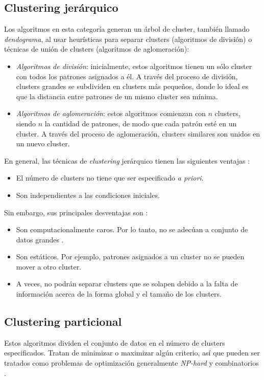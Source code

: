 \subsection{Clustering jerárquico}
Los algoritmos en esta categoría generan
un árbol de cluster, también llamado \emph{dendograma}, al usar heurísticas para
separar clusters (algoritmos de división) o técnicas de unión de clusters
(algoritmos de aglomeración):
    \begin{itemize}
        \item \emph{Algoritmos de división}: inicialmente, estos algoritmos
tienen un sólo cluster con todos los patrones asignados a él. A través del
proceso de división, clusters grandes se subdividen en clusters más pequeños,
donde lo ideal es que la distancia entre patrones de un mismo cluster sea
mínima.
        \item \emph{Algoritmos de aglomeración}: estos algoritmos comienzan con
$n$ clusters, siendo $n$ la cantidad de patrones, de modo que cada patrón esté
en un cluster. A través del proceso de aglomeración, clusters similares son
unidos en un nuevo cluster.
    \end{itemize}

En general, las técnicas de \emph{clustering} jerárquico tienen las siguientes
ventajas \cite{PSO_0}:
    \begin{itemize}
        \item El número de clusters no tiene que ser especificado \emph{a priori}.
        \item Son independientes a las condiciones iniciales.
    \end{itemize}
Sin embargo, sus principales desventajas son \cite{PSO_0}:
    \begin{itemize}
        \item Son computacionalmente caros. Por lo tanto, no se adecúan a conjunto
de datos grandes \cite{DC_2}.
        \item Son estáticos. Por ejemplo, patrones asignados a un cluster no se
pueden mover a otro cluster.
        \item A veces, no podrán separar clusters que se solapen debido a la
falta de información acerca de la forma global y el tamaño de los clusters.
    \end{itemize}

\subsection{Clustering particional} 
\label{sect:cpart}
Estos algoritmos dividen el conjunto
de datos en el número de clusters especificados. Tratan de minimizar o maximizar
algún criterio, así que pueden ser tratados como problemas de optimización
generalmente \emph{NP-hard} y combinatorios \cite{DC_3}.

